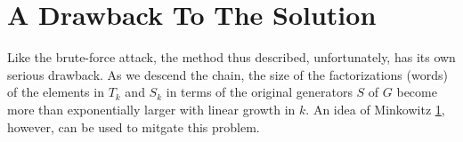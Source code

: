 \documentclass[12pt]{article}
\begin{document}
\section{A Drawback To The Solution}

Like the brute-force attack, the method thus described, unfortunately, has its
own serious drawback.  As we descend the chain, the size of the factorizations
(words) of the elements in $T_k$ and $S_k$ in terms of the original generators
$S$ of $G$ become more than exponentially larger with linear growth in $k$.
An idea of Minkowitz \ref{}, however, can be used to mitgate this problem.
\end{document}
